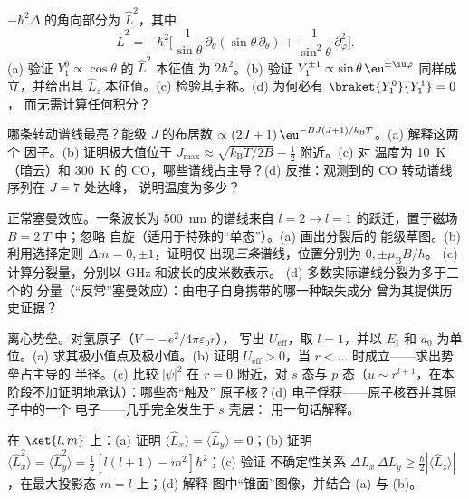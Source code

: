 \begin{exercise}[$\star\star$]\label{exo:b3:quantum-angular-momentum:5}
$-\hbar^2\Delta$ 的角向部分为 $\hat L^2$，其中
\[
\hat L^2 = -\hbar^2\Big[\frac{1}{\sin\theta}\,\partial_\theta
(\sin\theta\,\partial_\theta) +
\frac{1}{\sin^2\theta}\,\partial_\varphi^2\Big] .
\]
(a) 验证 $Y_1^0 \propto \cos\theta$ 的 $\hat L^2$ 本征值
为 $2\hbar^2$。(b) 验证 $Y_1^{\pm1} \propto \sin\theta\,
\eu^{\pm\iu\varphi}$ 同样成立，并给出其 $\hat L_z$ 本征值。(c)
检验其宇称。(d) 为何必有 $\braket{Y_1^0}{Y_1^1} = 0$，
而无需计算任何积分？
\end{exercise}

\begin{exercise}[$\star\star$]\label{exo:b3:quantum-angular-momentum:6}
哪条转动谱线最亮？能级 $J$ 的布居数
$\propto (2J+1)\,\eu^{-BJ(J+1)/k_{\text{B}}T}$。(a) 解释这两个
因子。(b) 证明极大值位于 $J_{\max} \approx
\sqrt{k_{\text{B}}T/2B} - \tfrac12$ 附近。(c) 对
温度为 \qty{10}{K}（暗云）和 \qty{300}{K} 的 CO，哪些谱线占主导？(d)
反推：观测到的 CO 转动谱线序列在 $J = 7$ 处达峰，
说明温度为多少？
\end{exercise}

\begin{exercise}[$\star\star$]\label{exo:b3:quantum-angular-momentum:7}
正常塞曼效应。一条波长为 \qty{500}{nm} 的谱线来自
$l = 2 \to l = 1$ 的跃迁，置于磁场 $B = \qty{2}{T}$ 中；忽略
自旋（适用于特殊的“单态”）。(a) 画出分裂后的
能级草图。(b) 利用选择定则 $\Delta m = 0, \pm1$，证明仅
出现\emph{三条}谱线，位置分别为 $0, \pm\mu_{\text{B}}B/h$。
(c) 计算分裂量，分别以 GHz 和波长的皮米数表示。
(d) 多数实际谱线分裂为多于三个的
分量（“反常”塞曼效应）：由电子自身携带的哪一种缺失成分
曾为其提供历史证据？
\end{exercise}

\begin{exercise}[$\star\star$]\label{exo:b3:quantum-angular-momentum:8}
离心势垒。对氢原子（$V = -e^2/4\pi\varepsilon_0r$），
写出 $U_{\text{eff}}$，取 $l = 1$，并以 $E_{\text{I}}$ 和
$a_0$ 为单位。(a) 求其极小值点及极小值。(b) 证明 $U_{\text{eff}} >
0$，当 $r < \dots$ 时成立——求出势垒占主导的
半径。(c) 比较 $|\psi|^2$ 在 $r = 0$ 附近，对 $s$ 态与
$p$ 态（$u \sim r^{l+1}$，在本阶段不加证明地承认）：哪些态“触及”
原子核？(d) 电子俘获——原子核吞并其原子中的一个
电子——几乎完全发生于 $s$ 壳层：
用一句话解释。
\end{exercise}

\begin{exercise}[$\star\star$]\label{exo:b3:quantum-angular-momentum:9}
在 $\ket{l, m}$ 上：(a) 证明 $\langle\hat L_x\rangle = \langle\hat
L_y\rangle = 0$；(b) 证明 $\langle\hat L_x^2\rangle = \langle\hat
L_y^2\rangle = \tfrac12[l(l+1) - m^2]\hbar^2$；(c) 验证
不确定性关系 $\Delta L_x\,\Delta L_y \ge \tfrac\hbar2
|\langle\hat L_z\rangle|$，在最大投影态 $m = l$ 上；(d) 解释
图中“锥面”图像，并结合
(a) 与 (b)。
\end{exercise}

